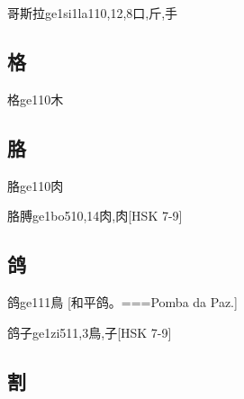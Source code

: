\begin{EntryWithPhonetic}{哥斯拉}{ge1si1la1}{10,12,8}{⼝,⽄,⼿}
\end{EntryWithPhonetic}

\subsection*{格}

\begin{EntryWithPhonetic}{格}{ge1}{10}{⽊}
\end{EntryWithPhonetic}

\subsection*{胳}

\begin{EntryWithPhonetic}{胳}{ge1}{10}{⾁}
\end{EntryWithPhonetic}

\begin{EntryWithPhonetic}{胳膊}{ge1bo5}{10,14}{⾁,⾁}[HSK 7-9]
\end{EntryWithPhonetic}

\subsection*{鸽}

\begin{EntryWithPhonetic}{鸽}{ge1}{11}{⿃}
  [和平鸽。===Pomba da Paz.]
\end{EntryWithPhonetic}

\begin{EntryWithPhonetic}{鸽子}{ge1zi5}{11,3}{⿃,⼦}[HSK 7-9]
\end{EntryWithPhonetic}

\subsection*{割}

